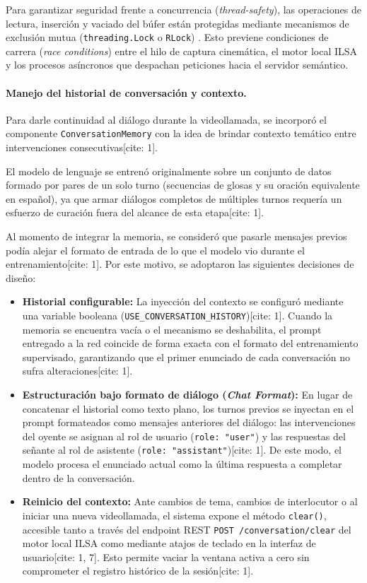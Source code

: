 Para garantizar seguridad frente a concurrencia (\textit{thread-safety}), las operaciones de lectura, inserción y vaciado del búfer están protegidas mediante mecanismos de exclusión mutua (\texttt{threading.Lock} o \texttt{RLock}) \parencite{pressman2014software}. Esto previene condiciones de carrera (\textit{race conditions}) entre el hilo de captura cinemática, el motor local ILSA y los procesos asíncronos que despachan peticiones hacia el servidor semántico.

\paragraph{Manejo del historial de conversación y contexto.}
Para darle continuidad al diálogo durante la videollamada, se incorporó el componente \texttt{ConversationMemory} con la idea de brindar contexto temático entre intervenciones consecutivas[cite: 1]. 

El modelo de lenguaje se entrenó originalmente sobre un conjunto de datos formado por pares de un solo turno (secuencias de glosas y su oración equivalente en español), ya que armar diálogos completos de múltiples turnos requería un esfuerzo de curación fuera del alcance de esta etapa[cite: 1]. 

Al momento de integrar la memoria, se consideró que pasarle mensajes previos podía alejar el formato de entrada de lo que el modelo vio durante el entrenamiento[cite: 1]. Por este motivo, se adoptaron las siguientes decisiones de diseño:
\begin{itemize}
    \item \textbf{Historial configurable:} La inyección del contexto se configuró mediante una variable booleana (\texttt{USE\_CONVERSATION\_HISTORY})[cite: 1]. Cuando la memoria se encuentra vacía o el mecanismo se deshabilita, el prompt entregado a la red coincide de forma exacta con el formato del entrenamiento supervisado, garantizando que el primer enunciado de cada conversación no sufra alteraciones[cite: 1].
    \item \textbf{Estructuración bajo formato de diálogo (\textit{Chat Format}):} En lugar de concatenar el historial como texto plano, los turnos previos se inyectan en el prompt formateados como mensajes anteriores del diálogo: las intervenciones del oyente se asignan al rol de usuario (\texttt{role: "user"}) y las respuestas del señante al rol de asistente (\texttt{role: "assistant"})[cite: 1]. De este modo, el modelo procesa el enunciado actual como la última respuesta a completar dentro de la conversación.
    \item \textbf{Reinicio del contexto:} Ante cambios de tema, cambios de interlocutor o al iniciar una nueva videollamada, el sistema expone el método \texttt{clear()}, accesible tanto a través del endpoint REST \texttt{POST /conversation/clear} del motor local ILSA como mediante atajos de teclado en la interfaz de usuario[cite: 1, 7]. Esto permite vaciar la ventana activa a cero sin comprometer el registro histórico de la sesión[cite: 1].
\end{itemize}
